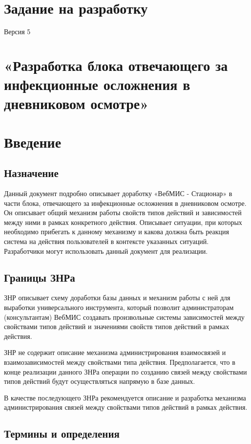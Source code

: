 \documentclass[a4paper,8pt]{report} %
\begin{document}
 \section*{Задание на разработку}
 {\tiny Версия 5}
 {\small
 \section*{«Разработка блока отвечающего за инфекционные осложнения в дневниковом осмотре»}
 \section{Введение}

 \subsection{Назначение}
    Данный документ подробно описывает доработку «ВебМИС - Стационар» в части
    блока, отвечающего за инфекционные осложнения в дневниковом осмотре. Он описывает
    общий механизм работы свойств типов действий и зависимостей между ними в рамках
    конкретного действия. Описывает ситуации, при которых необходимо прибегать к данному
    механизму и какова должна быть реакция система на действия пользователей в контексте
    указанных ситуаций. Разработчики могут использовать данный документ для реализации.

 \subsection{Границы ЗНРа}
    ЗНР описывает схему доработки базы данных и механизм работы с ней для
    выработки универсального инструмента, который позволит администраторам
    (консультантам) ВебМИС создавать произвольные системы зависимостей между
    свойствами типов действий и значениями свойств типов действий в рамках действия.

    ЗНР не содержит описание механизма администрирования взаимосвязей и
    взаимозависимостей между свойствами типа действия. Предполагается, что в конце
    реализации данного ЗНРа операции по созданию связей между свойствами типов
    действий будут осуществляться напрямую в базе данных.

    В качестве последующего ЗНРа рекомендуется описание и разработка механизма
    администрирования связей между свойствами типов действий в рамках действия.

 \subsection{Термины и определения}

}
\end{document}

